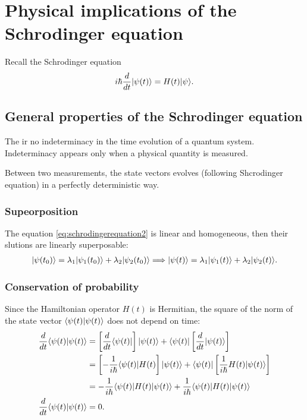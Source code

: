 \section{Physical implications of the Schrodinger equation}
Recall the Schrodinger equation
\begin{align}
    i\hbar\frac{d}{dt}|\psi(t)\rangle=H(t)|\psi\rangle.
    \label{eq:schrodingerequation2}
\end{align}

\subsection{General properties of the Schrodinger equation}

The ir no indeterminacy in the time evolution of a quantum system. Indeterminacy appears only when a physical quantity is measured.

\begin{emphasizer}
    Between two measurements, the state vectors evolves (following Shcrodinger equation) in a perfectly deterministic way.
\end{emphasizer}

\subsubsection{Supeorposition}
The equation \eqref{eq:schrodingerequation2} is linear and homogeneous, then their slutions are linearly superposable:
\begin{align}
    |\psi(t_0)\rangle=\lambda_1|\psi_1(t_0)\rangle+\lambda_2|\psi_2(t_0)\rangle\Longrightarrow|\psi(t)\rangle=\lambda_1|\psi_1(t)\rangle+\lambda_2|\psi_2(t)\rangle.
\end{align}

\subsubsection{Conservation of probability}
Since the Hamiltonian operator $H(t)$ is Hermitian, the square of the norm of the state vector $\langle\psi(t)|\psi(t)\rangle$ does not depend on time:
\begin{align*}
    \frac{d}{dt}\langle\psi(t)|\psi(t)\rangle&=\left[\frac{d}{dt}\langle\psi(t)|\right]|\psi(t)\rangle+\langle\psi(t)|\left[\frac{d}{dt}|\psi(t)\rangle\right]\\
    &=\left[-\frac{1}{i\hbar}\langle\psi(t)|H(t)\right]|\psi(t)\rangle+\langle\psi(t)|\left[\frac{1}{i\hbar}H(t)|\psi(t)\rangle\right]\\
    &=-\frac{1}{i\hbar}\langle\psi(t)|H(t)|\psi(t)\rangle+\frac{1}{i\hbar}\langle\psi(t)|H(t)|\psi(t)\rangle\\
    \frac{d}{dt}\langle\psi(t)|\psi(t)\rangle&=0.
\end{align*}

